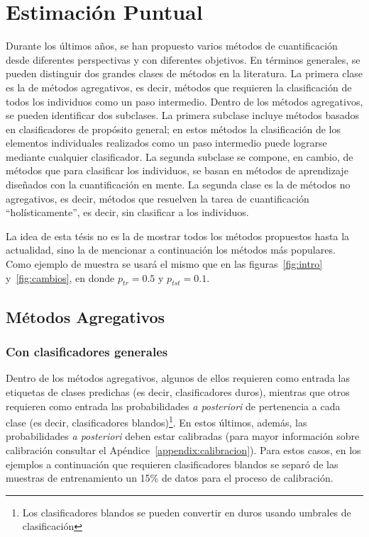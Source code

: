 \chapter{Estimación Puntual}\label{puntual}

Durante los últimos años, se han propuesto varios métodos de cuantificación
desde diferentes perspectivas y con diferentes objetivos. En términos generales,
se pueden distinguir dos grandes clases de métodos en la literatura. La primera
clase es la de métodos agregativos, es decir, métodos que requieren la
clasificación de todos los individuos como un paso intermedio. Dentro de los
métodos agregativos, se pueden identificar dos subclases. La primera subclase
incluye métodos basados en clasificadores de propósito general; en estos métodos
la clasificación de los elementos individuales realizados como un paso
intermedio puede lograrse mediante cualquier clasificador. La segunda subclase
se compone, en cambio, de métodos que para clasificar los individuos, se basan
en métodos de aprendizaje diseñados con la cuantificación en mente. La segunda
clase es la de métodos no agregativos, es decir, métodos que resuelven la tarea
de cuantificación “holísticamente”, es decir, sin clasificar a los individuos.

La idea de esta tésis no es la de mostrar todos los métodos propuestos hasta la
actualidad, sino la de mencionar a continuación los métodos más populares. Como
ejemplo de muestra se usará el mismo que en las figuras~\ref{fig:intro}
y~\ref{fig:cambios}, en donde $p_{tr}=0.5$ y $p_{tst}=0.1$.

\section{Métodos Agregativos}\label{puntual:agregativos}

\subsection{Con clasificadores generales}\label{puntual:generales}

Dentro de los métodos agregativos, algunos de ellos requieren como entrada las
etiquetas de clases predichas (es decir, clasificadores duros), mientras que
otros requieren como entrada las probabilidades {\it a posteriori\/} de
pertenencia a cada clase (es decir, clasificadores blandos)\footnote{Los
clasificadores blandos se pueden convertir en duros usando umbrales de
clasificación}. En estos últimos, además, las probabilidades {\it a
posteriori\/} deben estar calibradas (para mayor información sobre calibración
consultar el Apéndice~\ref{appendix:calibracion}). Para estos casos, en los
ejemplos a continuación que requieren clasificadores blandos se separó de las
muestras de entrenamiento un 15\% de datos para el proceso de calibración.

